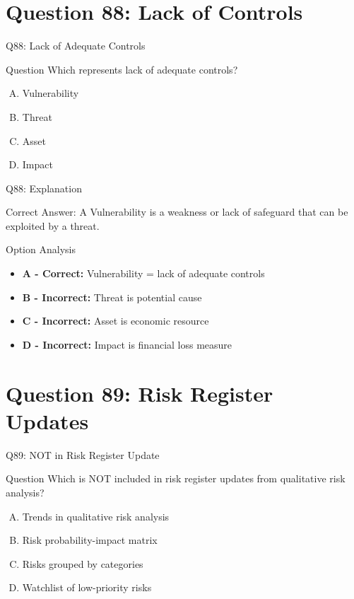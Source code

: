 \documentclass{beamer}
\begin{document}
	\section{Question 88: Lack of Controls}
	
	\begin{frame}{Q88: Lack of Adequate Controls}
		\begin{block}{Question}
			Which represents lack of adequate controls?
		\end{block}
		\begin{enumerate}[(A)]
			\item Vulnerability
			\item Threat
			\item Asset
			\item Impact
		\end{enumerate}
	\end{frame}
	
	\begin{frame}{Q88: Explanation}
		\begin{block}{Correct Answer: A}
			Vulnerability is a weakness or lack of safeguard that can be exploited by a threat.
		\end{block}
		\begin{block}{Option Analysis}
			\begin{itemize}
				\item \textbf{A - Correct:} Vulnerability = lack of adequate controls
				\item \textbf{B - Incorrect:} Threat is potential cause
				\item \textbf{C - Incorrect:} Asset is economic resource
				\item \textbf{D - Incorrect:} Impact is financial loss measure
			\end{itemize}
		\end{block}
	\end{frame}
	
	\section{Question 89: Risk Register Updates}
	
	\begin{frame}{Q89: NOT in Risk Register Update}
		\begin{block}{Question}
			Which is NOT included in risk register updates from qualitative risk analysis?
		\end{block}
		\begin{enumerate}[(A)]
			\item Trends in qualitative risk analysis
			\item Risk probability-impact matrix
			\item Risks grouped by categories
			\item Watchlist of low-priority risks
		\end{enumerate}
	\end{frame}
	
\end{document}
